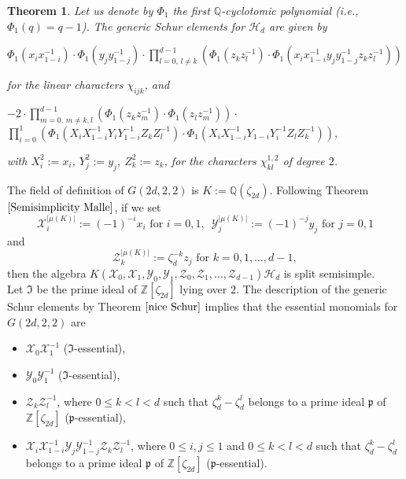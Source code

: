 \documentclass[10pt,a4paper,titlepage]{article}
\newtheorem{theorem}{Theorem}[section]
\begin{document}
\begin{theorem}\label{nice Schur}
Let us denote by $\Phi_1$ the first $\mathbb{Q}$-cyclotomic polynomial (i.e., $\Phi_1(q)=q-1$). The generic Schur elements for $\mathcal{H}_d$ are given by
\begin{center}
$\Phi_1(x_ix_{1-i}^{-1}) \cdot \Phi_1(y_jy_{1-j}^{-1})\cdot \prod_{l=0,\,l\neq k}^{d-1} (\Phi_1(z_kz_l^{-1})
\cdot \Phi_1(x_ix_{1-i}^{-1} y_jy_{1-j}^{-1}z_kz_l^{-1}))$
\end{center}
for the linear characters $\chi_{ijk}$, and
\begin{center}
$-2 \cdot \prod_{m=0,\,m\neq k,l}^{d-1}( \Phi_1(z_kz_m^{-1})\cdot \Phi_1(z_lz_m^{-1})) \cdot$ 
$\prod_{i=0}^1 (\Phi_1(X_iX_{1-i}^{-1}Y_iY_{1-i}^{-1}Z_kZ_l^{-1})\cdot
\Phi_1(X_iX_{1-i}^{-1}Y_{1-i}Y_{i}^{-1}Z_lZ_k^{-1})),$
\end{center}
with $X_i^2:=x_i$, $Y_j^2:=y_j$, $Z_k^2:=z_k$, for the characters $\chi_{kl}^{1,2}$ of degree $2$.
\end{theorem}

The field of definition of $G(2d,2,2)$ is $K:=\mathbb{Q}(\zeta_{2d})$. Following Theorem $\ref{Semisimplicity Malle}$, if we set
$$\mathcal{X}_i^{|\mu(K)|}:=(-1)^{-i}x_i \textrm{ for } i=0,1,\,\,\,  \mathcal{Y}_j^{|\mu(K)|}:=(-1)^{-j}y_j \textrm{ for } j=0,1$$
and
$$\mathcal{Z}_k^{|\mu(K)|}:=\zeta_d^{-k}z_j  \textrm{ for } k=0,1,\ldots,d-1,$$
then the algebra $K(\mathcal{X}_0,\mathcal{X}_1,\mathcal{Y}_0,\mathcal{Y}_1,\mathcal{Z}_0,\mathcal{Z}_1,\ldots,\mathcal{Z}_{d-1})\mathcal{H}_{d}$ is split semisimple.\\

Let $\mathfrak{I}$ be the prime ideal of $\mathbb{Z}[\zeta_{2d}]$ lying over $2$. The description of the generic Schur elements by Theorem $\ref{nice Schur}$ implies that the essential monomials for $G(2d,2,2)$ are
\begin{itemize}
\item $\mathcal{X}_0\mathcal{X}_1^{-1}$ ($\mathfrak{I}$-essential),
\item $\mathcal{Y}_0\mathcal{Y}_1^{-1}$ ($\mathfrak{I}$-essential),
\item $\mathcal{Z}_k\mathcal{Z}_l^{-1}$, where $0 \leq k<l<d$ such that $\zeta_d^k-\zeta_d^l$ belongs to a prime ideal $\mathfrak{p}$ of 
 $\mathbb{Z}[\zeta_{2d}]$ ($\mathfrak{p}$-essential),
\item $\mathcal{X}_i\mathcal{X}_{1-i}^{-1}\mathcal{Y}_j\mathcal{Y}_{1-j}^{-1}\mathcal{Z}_k\mathcal{Z}_l^{-1}$, where $0 \leq i,j \leq 1$ and $0 \leq k<l<d$ such that $\zeta_d^k-\zeta_d^l$ belongs to a prime ideal $\mathfrak{p}$ of $\mathbb{Z}[\zeta_{2d}]$ ($\mathfrak{p}$-essential).
\end{itemize}
\end{document}
